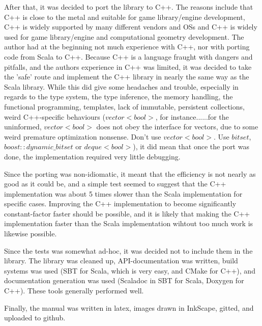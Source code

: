 After that, it was decided to port the library to C++.
The reasons include that C++ is close to the metal and
suitable for game library/engine development,
C++ is widely supported by many different vendors and OSs and
C++ is widely used for game library/engine and computational geometry development.
The author had at the beginning not much experience with C++,
nor with porting code from Scala to C++.
Because C++ is a language fraught with dangers and pitfalls,
and the authors experience in C++ was limited,
it was decided to take the 'safe' route and implement
the C++ library in nearly the same way as the Scala library.
While this did give some headaches and trouble,
especially in regards to the type system, the type inference,
the memory handling, the functional programming, templates,
lack of immutable, persistent collections, weird C++-specific behaviours
($vector<bool>$, for instance......for the uninformed,
$vector<bool>$ does not obey the interface for vectors,
due to some weird premature optimization nonsense.
Don't use $vector<bool>$. Use $bitset$, $boost::dynamic\_bitset$ or
$deque<bool>$), it did mean that
once the port was done, the implementation required very little
debugging.

Since the porting was non-idiomatic, it meant that the efficiency
is not nearly as good as it could be, and a simple test
seemed to suggest that the C++ implementation was about 5 times
slower than the Scala implementation for specific cases.
Improving the C++ implementation to become significantly
constant-factor faster should be possible, and it is likely
that making the C++ implementation faster than the Scala
implementation wihtout too much work is likewise possible.

Since the tests was somewhat ad-hoc, it was decided not to
include them in the library.
The library was cleaned up, API-documentation was written,
build systems was used (SBT for Scala, which is very easy,
and CMake for C++), and documentation generation was used
(Scaladoc in SBT for Scala, Doxygen for C++).
These tools generally performed well.

Finally, the manual was written in latex,
images drawn in InkScape,
gitted, and uploaded to github.

